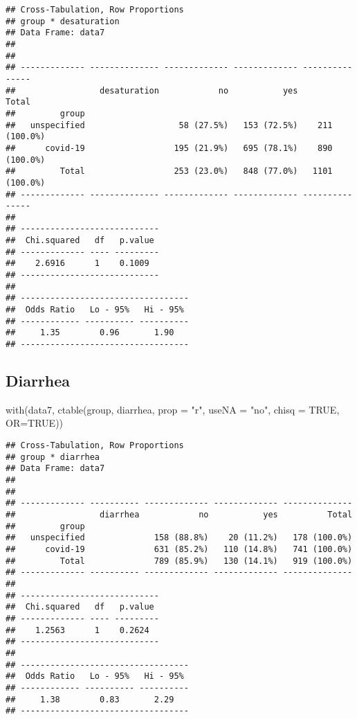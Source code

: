 \documentclass[
]{article}
\newenvironment{Shaded}{\begin{snugshade}}{\end{snugshade}}
\newcommand{\AttributeTok}[1]{\textcolor[rgb]{0.77,0.63,0.00}{#1}}
\newcommand{\ConstantTok}[1]{\textcolor[rgb]{0.00,0.00,0.00}{#1}}
\newcommand{\FunctionTok}[1]{\textcolor[rgb]{0.00,0.00,0.00}{#1}}
\newcommand{\NormalTok}[1]{#1}
\newcommand{\StringTok}[1]{\textcolor[rgb]{0.31,0.60,0.02}{#1}}
\begin{document}
\begin{verbatim}
## Cross-Tabulation, Row Proportions  
## group * desaturation  
## Data Frame: data7  
## 
## 
## ------------- -------------- ------------- ------------- ---------------
##                 desaturation            no           yes           Total
##         group                                                           
##   unspecified                   58 (27.5%)   153 (72.5%)    211 (100.0%)
##      covid-19                  195 (21.9%)   695 (78.1%)    890 (100.0%)
##         Total                  253 (23.0%)   848 (77.0%)   1101 (100.0%)
## ------------- -------------- ------------- ------------- ---------------
## 
## ----------------------------
##  Chi.squared   df   p.value 
## ------------- ---- ---------
##    2.6916      1    0.1009  
## ----------------------------
## 
## ----------------------------------
##  Odds Ratio   Lo - 95%   Hi - 95% 
## ------------ ---------- ----------
##     1.35        0.96       1.90   
## ----------------------------------
\end{verbatim}

\hypertarget{diarrhea}{%
\subsection{Diarrhea}\label{diarrhea}}

\begin{Shaded}
\begin{Highlighting}[]
\FunctionTok{with}\NormalTok{(data7, }\FunctionTok{ctable}\NormalTok{(group, diarrhea, }\AttributeTok{prop =} \StringTok{"r"}\NormalTok{, }\AttributeTok{useNA =} \StringTok{"no"}\NormalTok{, }\AttributeTok{chisq =} \ConstantTok{TRUE}\NormalTok{, }\AttributeTok{OR=}\ConstantTok{TRUE}\NormalTok{))}
\end{Highlighting}
\end{Shaded}

\begin{verbatim}
## Cross-Tabulation, Row Proportions  
## group * diarrhea  
## Data Frame: data7  
## 
## 
## ------------- ---------- ------------- ------------- --------------
##                 diarrhea            no           yes          Total
##         group                                                      
##   unspecified              158 (88.8%)    20 (11.2%)   178 (100.0%)
##      covid-19              631 (85.2%)   110 (14.8%)   741 (100.0%)
##         Total              789 (85.9%)   130 (14.1%)   919 (100.0%)
## ------------- ---------- ------------- ------------- --------------
## 
## ----------------------------
##  Chi.squared   df   p.value 
## ------------- ---- ---------
##    1.2563      1    0.2624  
## ----------------------------
## 
## ----------------------------------
##  Odds Ratio   Lo - 95%   Hi - 95% 
## ------------ ---------- ----------
##     1.38        0.83       2.29   
## ----------------------------------
\end{verbatim}
\end{document}
